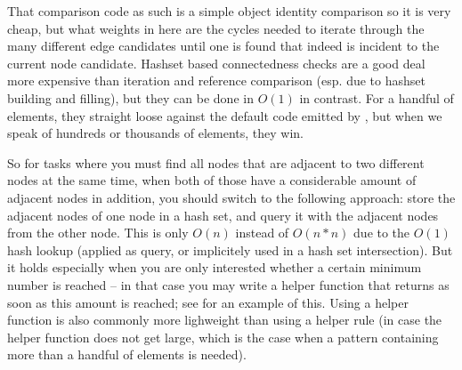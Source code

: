 That comparison code as such is a simple object identity comparison so it is very cheap, 
but what weights in here are the cycles needed to iterate through the many different edge candidates until one is found that indeed is incident to the current node candidate.
Hashset based connectedness checks are a good deal more expensive than iteration and reference comparison (esp. due to hashset building and filling), but they can be done in $O(1)$ in contrast.
For a handful of elements, they straight loose against the default code emitted by \GrG, but when we speak of hundreds or thousands of elements, they win.

So for tasks where you must find all nodes that are adjacent to two different nodes at the same time, when both of those have a considerable amount of adjacent nodes in addition, you should switch to the following approach:
store the adjacent nodes of one node in a hash set, and query it with the adjacent nodes from the other node.
This is only $O(n)$ instead of $O(n*n)$ due to the $O(1)$ hash lookup (applied as query, or implicitely used in a hash set intersection).
But it holds especially when you are only interested whether a certain minimum number is reached -- in that case you may write a helper function that returns as soon as this amount is reached; see \cite{MovieDatabase} for an example of this.
Using a helper function is also commonly more lighweight than using a helper rule (in case the helper function does not get large, which is the case when a pattern containing more than a handful of elements is needed).

